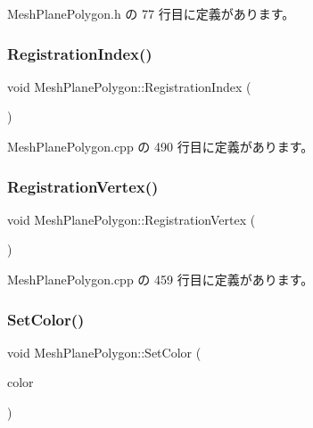  Mesh\+Plane\+Polygon.\+h の 77 行目に定義があります。

\mbox{\label{class_mesh_plane_polygon_aab346c974196e257399095dd914aaa51}} 
\subsubsection{\texorpdfstring{Registration\+Index()}{RegistrationIndex()}}
{\footnotesize\ttfamily void Mesh\+Plane\+Polygon\+::\+Registration\+Index (\begin{DoxyParamCaption}{ }\end{DoxyParamCaption})\hspace{0.3cm}{\ttfamily [private]}}



 Mesh\+Plane\+Polygon.\+cpp の 490 行目に定義があります。

\mbox{\label{class_mesh_plane_polygon_ae3c43c5641c962ac848b3dadd3ea15e5}} 
\subsubsection{\texorpdfstring{Registration\+Vertex()}{RegistrationVertex()}}
{\footnotesize\ttfamily void Mesh\+Plane\+Polygon\+::\+Registration\+Vertex (\begin{DoxyParamCaption}{ }\end{DoxyParamCaption})\hspace{0.3cm}{\ttfamily [private]}}



 Mesh\+Plane\+Polygon.\+cpp の 459 行目に定義があります。

\mbox{\label{class_mesh_plane_polygon_a514e1738386a6a4be0d37ea38bd425f2}} 
\subsubsection{\texorpdfstring{Set\+Color()}{SetColor()}}
{\footnotesize\ttfamily void Mesh\+Plane\+Polygon\+::\+Set\+Color (\begin{DoxyParamCaption}\item[{\mbox{\hyperlink{_vector3_d_8h_a680c30c4a07d86fe763c7e01169cd6cc}{X\+Color4}}}]{color }\end{DoxyParamCaption})}



